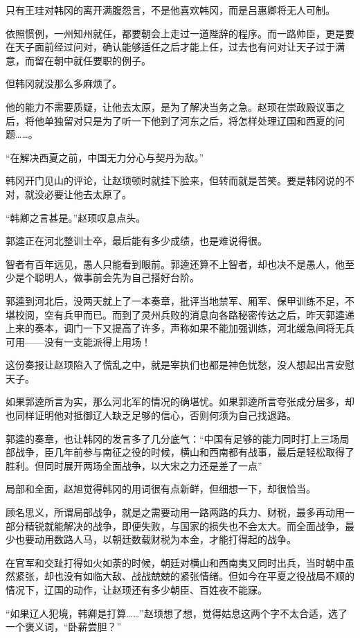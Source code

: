 只有王珪对韩冈的离开满腹怨言，不是他喜欢韩冈，而是吕惠卿将无人可制。

依照惯例，一州知州就任，都要朝会上走过一道陛辞的程序。而一路帅臣，更是要在天子面前经过问对，确认能够适任之后才能上任，过去也有问对让天子过于满意，而留在朝中就任要职的例子。

但韩冈就没那么多麻烦了。

他的能力不需要质疑，让他去太原，是为了解决当务之急。赵顼在崇政殿议事之后，将他单独留对只是为了听一下他到了河东之后，将怎样处理辽国和西夏的问题……。

“在解决西夏之前，中国无力分心与契丹为敌。”

韩冈开门见山的评论，让赵顼顿时就挂下脸来，但转而就是苦笑。要是韩冈说的不对，就没必要让他去太原了。

“韩卿之言甚是。”赵顼叹息点头。

郭逵正在河北整训士卒，最后能有多少成绩，也是难说得很。

智者有百年远见，愚人只能看到眼前。郭逵还算不上智者，却也决不是愚人，他至少是个聪明人，做事前会先为自己搭好台阶。

郭逵到河北后，没两天就上了一本奏章，批评当地禁军、厢军、保甲训练不足，不堪校阅，空有兵甲而已。而到了灵州兵败的消息向各路秘密传达之后，昨天郭逵递上来的奏本，调门一下又提高了许多，声称如果不能加强训练，河北缓急间将无兵可用——没有一支能派得上用场！

这份奏报让赵顼陷入了慌乱之中，就是宰执们也都是神色忧愁，没人想起出言安慰天子。

如果郭逵所言为实，那么河北军的情况的确堪忧。如果郭逵所言夸张成分居多，却也同样证明他对抵御辽人缺乏足够的信心，否则何须为自己找退路。

郭逵的奏章，也让韩冈的发言多了几分底气：“中国有足够的能力同时打上三场局部战争，臣几年前参与南征之役的时候，横山和西南都有战事，最后是轻松取得了胜利。但同时展开两场全面战争，以大宋之力还是差了一点”

局部和全面，赵旭觉得韩冈的用词很有点新鲜，但细想一下，却很恰当。

顾名思义，所谓局部战争，就是之需要动用一路两路的兵力、财税，最多再动用一部分精锐就能解决的战争，即便失败，与国家的损失也不会太大。而全面战争，最少也要动用数路人马，以朝廷数载财税为本金，才能打得起的战争。

在官军和交趾打得如火如荼的时候，朝廷对横山和西南夷又同时出兵，当时朝中虽然紧张，却也没有如临大敌、战战兢兢的紧张情绪。但如今在平夏之役战局不顺的情况下，辽国的动作，让赵顼还有多少朝臣、百姓夜不能寐。

“如果辽人犯境，韩卿是打算……”赵顼想了想，觉得姑息这两个字不太合适，选了一个褒义词，“卧薪尝胆？”

